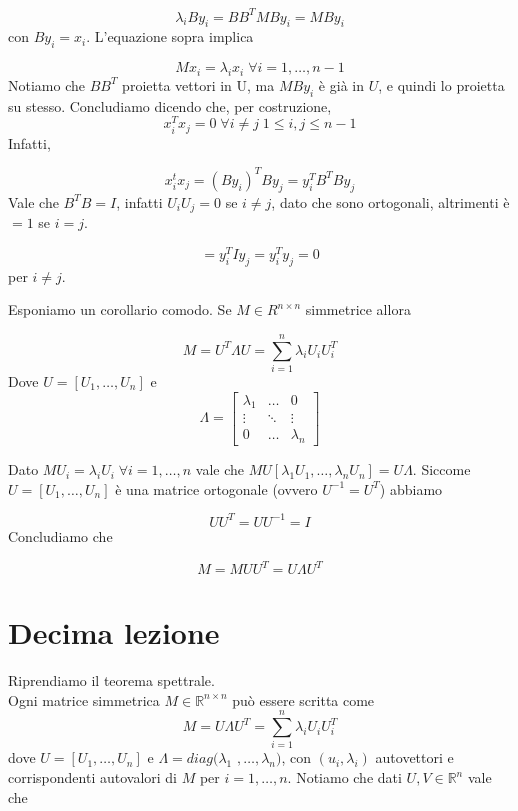 \documentclass[12pt]{report}
\begin{document}
\begin{dimo}
    $$\lambda_i By_i = BB^T M B y_i = MBy_i$$
    con $By_i = x_i$. L'equazione sopra implica

    $$Mx_i = \lambda_i x_i \; \forall i = 1,\dots,n-1$$
    Notiamo che $BB^T$ proietta vettori in U, ma $MBy_i$ è già in $U$, e quindi lo proietta su stesso.
    Concludiamo dicendo che, per costruzione, $$x_i^T x_j = 0 \; \forall i \neq j \; 1 \leq i,j \leq n-1$$ 
    Infatti, 

    $$x_i^t x_j = (By_i)^T By_j = y_i^T B^T B y_j$$
    Vale che $B^T B = I$, infatti $U_i U_j = 0$ se $i \neq j$, dato che sono ortogonali, altrimenti è $= 1$ se $i = j$.

    $$= y_i^T  I y_j = y_i^T y_j = 0 $$
    per $i \neq j$.
\end{dimo}

\begin{corollario}
    Esponiamo un corollario comodo.  Se $M \in R^{n \times n}$ simmetrice allora 

    $$M = U^T \Lambda U = \sum_{i = 1}^n \lambda_i U_i U_i^T$$
    Dove $U = [U_1,\dots,U_n]$ e
    \[
    \Lambda = \begin{bmatrix} 
        \lambda_1 & \dots & 0 \\
        \vdots & \ddots & \vdots \\
        0 & \dots & \lambda_n
        \end{bmatrix}
    \]
\end{corollario}

\begin{dimo}
    Dato $M U_i = \lambda_i U_i \; \forall i = 1,\dots,n$  vale che $MU[\lambda_1U_1,\dots,\lambda_nU_n] = U\Lambda$. Siccome $U = [U_1,\dots,U_n]$ è una matrice ortogonale (ovvero $U^{-1} = U^T$) abbiamo 

    $$U U^T = UU^{-1} = I$$
    Concludiamo che 

    $$M = MUU^T = U \Lambda U^T$$
\end{dimo}

\chapter{Decima lezione}


\noindent
Riprendiamo il teorema spettrale. \\ Ogni matrice simmetrica $M \in \mathbb{R}^{n \times n}$ può essere scritta come $$M = U \Lambda U^T = \sum_{i = 1}^n \lambda_i U_i U_i^T$$
dove $U = [U_1,\dots,U_n]$ e $\Lambda = diag(\lambda_1$ $,\dots,\lambda_n)$, con $(u_i,\lambda_i)$ autovettori e corrispondenti autovalori di $M$ per $i = 1,\dots,n$.
Notiamo che dati $U,V \in \mathbb{R}^n$ vale che 
\end{document}
